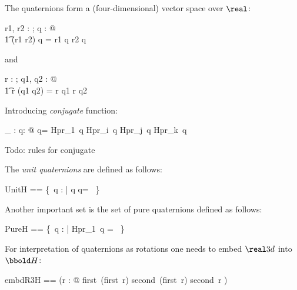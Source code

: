 \documentclass[12pt]{article}
\begin{document}
%
The quaternions form a (four-dimensional) vector space over $\real$:
\begin{zed}
  \forall r1, r2 : \real; q : \quaternions @\\
  \t1 (r1 \aplus r2) \amult q = r1 \amult q \aplus r2 \amult q
\end{zed}
%
and
%
\begin{zed}
  \forall r : \real; q1, q2 : \quaternions @\\
  \t1 r \amult (q1 \aplus q2) = r \amult q1 \aplus r \amult q2 \\
\end{zed}
%
Introducing \emph{conjugate} function:
\begin{axdef}
  \_ \aconj : \quaternions \fun \quaternions
  \where
  \forall q: \quaternions @ q\aconj = Hpr\_1~q \amult \aone \aminus
  Hpr\_i~q \amult \iu \aminus Hpr\_j~q \amult \ju \aminus Hpr\_k~q \amult \ku
\end{axdef}
%
Todo: rules for conjugate
%

The \emph{unit quaternions} are defined as follows:
\begin{zed}
  UnitH == \{~q : \quaternions | q \amult q\aconj = \aone~\}
\end{zed}
%
Another important set is the set of pure quaternions defined as
follows:
\begin{zed}
  PureH == \{~q : \quaternions | Hpr\_1~q = \azero~\}
\end{zed}

For interpretation of quaternions as rotations one needs to embed
$\real3d$ into $\quaternions$:
%
\begin{zed}
  embdR3H == (\lambda r : \realthreed @ first~(first~r) \amult \iu
  \aplus second~(first~r) \amult \ju \aplus second~r \amult \ku) 
\end{zed}
%
\end{document}
